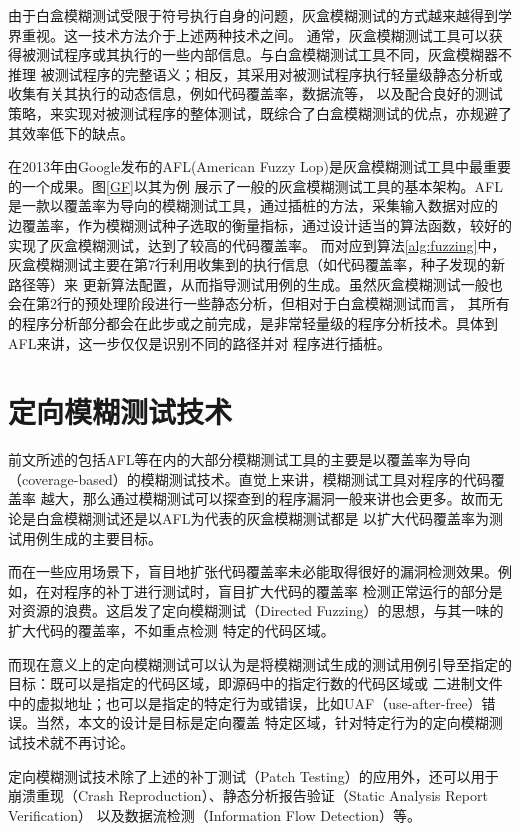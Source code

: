 \documentclass[bachelor]{njupthesis}
\begin{document}
由于白盒模糊测试受限于符号执行自身的问题，灰盒模糊测试的方式越来越得到学界重视。这一技术方法介于上述两种技术之间。
通常，灰盒模糊测试工具可以获得被测试程序或其执行的一些内部信息。与白盒模糊测试工具不同，灰盒模糊器不推理
被测试程序的完整语义；相反，其采用对被测试程序执行轻量级静态分析或收集有关其执行的动态信息，例如代码覆盖率，数据流等，
以及配合良好的测试策略，来实现对被测试程序的整体测试，既综合了白盒模糊测试的优点，亦规避了其效率低下的缺点。

在2013年由Google发布的AFL\cite{AFL}(American Fuzzy Lop)是灰盒模糊测试工具中最重要的一个成果。图\ref{GF}以其为例
展示了一般的灰盒模糊测试工具的基本架构。AFL是一款以覆盖率为导向的模糊测试工具，通过插桩的方法，采集输入数据对应的
边覆盖率，作为模糊测试种子选取的衡量指标，通过设计适当的算法函数，较好的实现了灰盒模糊测试，达到了较高的代码覆盖率。
而对应到算法\ref{alg:fuzzing}中，灰盒模糊测试主要在第7行利用收集到的执行信息（如代码覆盖率，种子发现的新路径等）来
更新算法配置，从而指导测试用例的生成。虽然灰盒模糊测试一般也会在第2行的预处理阶段进行一些静态分析，但相对于白盒模糊测试而言，
其所有的程序分析部分都会在此步或之前完成，是非常轻量级的程序分析技术。具体到AFL来讲，这一步仅仅是识别不同的路径并对
程序进行插桩。

\section{定向模糊测试技术}
前文所述的包括AFL等在内的大部分模糊测试工具的主要是以覆盖率为导向（coverage-based）的模糊测试技术。直觉上来讲，模糊测试工具对程序的代码覆盖率
越大，那么通过模糊测试可以探查到的程序漏洞一般来讲也会更多。故而无论是白盒模糊测试还是以AFL为代表的灰盒模糊测试都是
以扩大代码覆盖率为测试用例生成的主要目标。

而在一些应用场景下，盲目地扩张代码覆盖率未必能取得很好的漏洞检测效果。例如，在对程序的补丁进行测试时，盲目扩大代码的覆盖率
检测正常运行的部分是对资源的浪费。这启发了定向模糊测试（Directed Fuzzing）的思想，与其一味的扩大代码的覆盖率，不如重点检测
特定的代码区域。

而现在意义上的定向模糊测试可以认为是将模糊测试生成的测试用例引导至指定的目标：既可以是指定的代码区域，即源码中的指定行数的代码区域或
二进制文件中的虚拟地址；也可以是指定的特定行为或错误，比如UAF（use-after-free）错误。当然，本文的设计是目标是定向覆盖
特定区域，针对特定行为的定向模糊测试技术就不再讨论。

定向模糊测试技术除了上述的补丁测试（Patch Testing）的应用外，还可以用于崩溃重现（Crash Reproduction）、静态分析报告验证（Static Analysis Report Verification）
以及数据流检测（Information Flow Detection）等。
\end{document}

